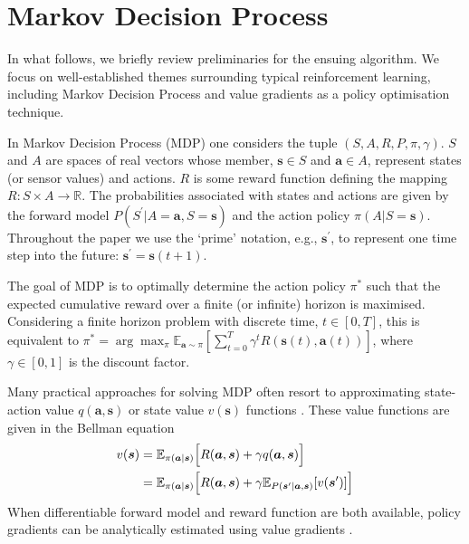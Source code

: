 \documentclass[utf8]{frontiersSCNS}
\newcommand{\bs}{\boldsymbol}
\newcommand{\argmax}{\arg\max}
\begin{document}
\section{Markov Decision Process}

In what follows, we briefly review preliminaries for the ensuing algorithm. We focus on well-established themes surrounding typical reinforcement learning, including Markov Decision Process and value gradients as a policy optimisation technique. 

In Markov Decision Process (MDP) one considers the tuple $(S, A, R, P, \pi, \gamma)$. $S$ and $A$ are spaces of real vectors whose member, $\bs{s} \in S$ and $\bs{a} \in A$, represent states (or sensor values) and actions. $R$ is some reward function defining the mapping $R: S \times A \to \mathbb{R}$. The probabilities associated with states and actions are given by the forward model $P (S^\prime|A=\bs{a}, S=\bs{s})$ and the action policy $\pi(A|S=\bs{s})$. Throughout the paper we use the `prime' notation, e.g., $\bs{s}^\prime$, to represent one time step into the future: $\bs{s}^\prime=\bs{s}(t+1)$.

The goal of MDP is to optimally determine the action policy $\pi^\ast$ such that the expected cumulative reward over a finite (or infinite) horizon is maximised. Considering a finite horizon problem with discrete time, $t \in [0, T]$, this is equivalent to $\pi^\ast = \argmax_\pi \mathbb E_{\bs{a} \sim \pi}\left[ \sum_{t=0}^{T}\gamma^t R(\bs{s}(t), \bs{a}(t)) \right]$, where $\gamma \in [0, 1]$ is the discount factor.

Many practical approaches for solving MDP often resort to approximating state-action value $q(\bs{a}, \bs{s})$ or state value $v(\bs{s})$ functions \citep{sutton1998reinforcement, deepmind2013atari, deepmind2015lillicrap, svg}. These value functions are given in the Bellman equation
%
	\begin{equation}
	\begin{aligned} \label{eq:bellman}
	v(\bs{s}) 
	&=
	\mathbb{E}_{\pi(\bs{a}|\bs{s})} 
	\Bigl[ R(\bs{a}, \bs{s}) + \gamma q(\bs{a}, \bs{s}) \Bigr] \\
	&=
	\mathbb{E}_{\pi(\bs{a}|\bs{s})} 
	\Bigl[ R(\bs{a}, \bs{s}) + \gamma \mathbb{E}_{P(\bs{s}^\prime|\bs{a}, \bs{s})} [v(\bs{s}^\prime)] \Bigr]
	\end{aligned}
	\end{equation}
%
When differentiable forward model and reward function are both available, policy gradients can be analytically estimated using value gradients \citep{2012fairbank, svg}.
\end{document}
